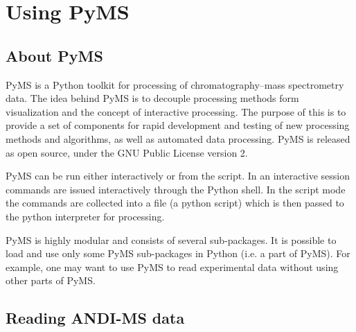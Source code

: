 

\chapter{Using PyMS}

\section{About PyMS}

PyMS is a Python toolkit for processing of chromatography--mass
spectrometry data. The idea behind PyMS is to decouple processing
methods form visualization and the concept of interactive processing.
The purpose of this is to provide a set of components for rapid
development and testing of new processing methods and algorithms,
as well as automated data processing. PyMS is released as open source,
under the GNU Public License version 2.  

PyMS can be run either interactively or from the script.  In an
interactive session commands are issued interactively through the
Python shell. In the script mode the commands are collected into a
file (a python script) which is then passed to the python interpreter
for processing.

PyMS is highly modular and consists of several sub-packages. It is
possible to load and use only some PyMS sub-packages in Python (i.e.
a part of PyMS).  For example, one may want to use PyMS to read
experimental data without using other parts of PyMS.

\section{Reading ANDI-MS data}

